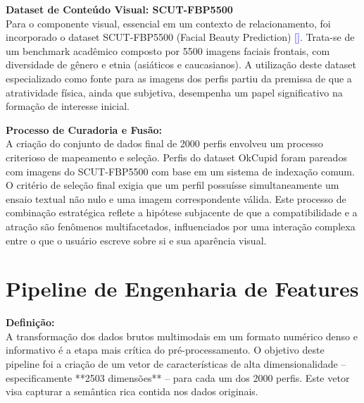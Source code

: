 \textbf{Dataset de Conteúdo Visual: SCUT-FBP5500} \\
Para o componente visual, essencial em um contexto de relacionamento, foi incorporado o dataset SCUT-FBP5500 (Facial Beauty Prediction) \textcolor{blue}{[\cite{wang2018scut}]}. Trata-se de um benchmark acadêmico composto por 5500 imagens faciais frontais, com diversidade de gênero e etnia (asiáticos e caucasianos). A utilização deste dataset especializado como fonte para as imagens dos perfis partiu da premissa de que a atratividade física, ainda que subjetiva, desempenha um papel significativo na formação de interesse inicial.

\textbf{Processo de Curadoria e Fusão:} \\
A criação do conjunto de dados final de 2000 perfis envolveu um processo criterioso de mapeamento e seleção. Perfis do dataset OkCupid foram pareados com imagens do SCUT-FBP5500 com base em um sistema de indexação comum. O critério de seleção final exigia que um perfil possuísse simultaneamente um ensaio textual não nulo e uma imagem correspondente válida. Este processo de combinação estratégica reflete a hipótese subjacente de que a compatibilidade e a atração são fenômenos multifacetados, influenciados por uma interação complexa entre o que o usuário escreve sobre si e sua aparência visual.

\section{Pipeline de Engenharia de Features}
\label{sec:pipeline_features}

\textbf{Definição:} \\
A transformação dos dados brutos multimodais em um formato numérico denso e informativo é a etapa mais crítica do pré-processamento. O objetivo deste pipeline foi a criação de um vetor de características de alta dimensionalidade -- especificamente **2503 dimensões** -- para cada um dos 2000 perfis. Este vetor visa capturar a semântica rica contida nos dados originais.

